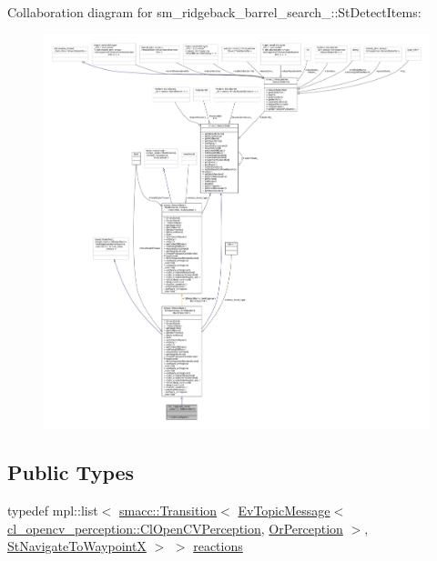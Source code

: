 Collaboration diagram for sm\+\_\+ridgeback\+\_\+barrel\+\_\+search\+\_\+:\+:St\+Detect\+Items\+:
\nopagebreak
\begin{figure}[H]
\begin{center}
\leavevmode
\includegraphics[width=350pt]{structsm__ridgeback__barrel__search__1_1_1StDetectItems__coll__graph}
\end{center}
\end{figure}
\subsection*{Public Types}
\begin{DoxyCompactItemize}
\item 
typedef mpl\+::list$<$ \hyperlink{classsmacc_1_1Transition}{smacc\+::\+Transition}$<$ \hyperlink{structsmacc_1_1default__events_1_1EvTopicMessage}{Ev\+Topic\+Message}$<$ \hyperlink{classsm__ridgeback__barrel__search__1_1_1cl__opencv__perception_1_1ClOpenCVPerception}{cl\+\_\+opencv\+\_\+perception\+::\+Cl\+Open\+C\+V\+Perception}, \hyperlink{classsm__ridgeback__barrel__search__1_1_1OrPerception}{Or\+Perception} $>$, \hyperlink{structsm__ridgeback__barrel__search__1_1_1StNavigateToWaypointX}{St\+Navigate\+To\+WaypointX} $>$ $>$ \hyperlink{structsm__ridgeback__barrel__search__1_1_1StDetectItems_a80033bef785c9240d22995e71b27ace9}{reactions}
\end{DoxyCompactItemize}
